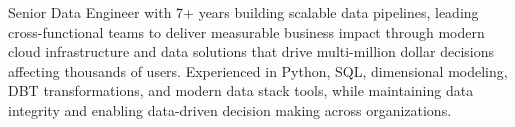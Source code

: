 
\begin{cvparagraph}
Senior Data Engineer with 7+ years building scalable data pipelines, leading cross-functional teams to deliver measurable business impact through modern cloud infrastructure and data solutions that drive multi-million dollar decisions affecting thousands of users. Experienced in Python, SQL, dimensional modeling, DBT transformations, and modern data stack tools, while maintaining data integrity and enabling data-driven decision making across organizations.
\end{cvparagraph}